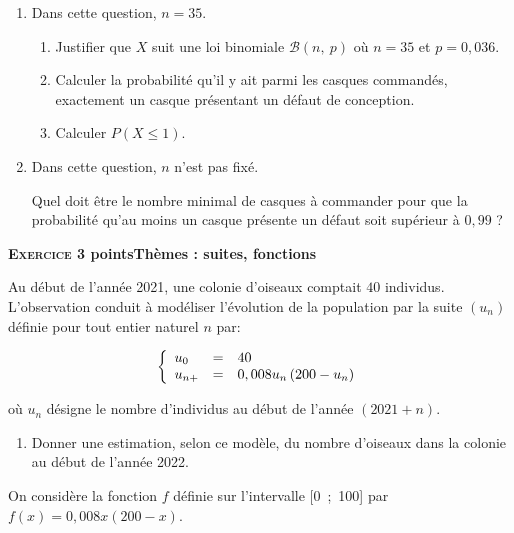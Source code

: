 \medskip

\begin{enumerate}
	\item Dans cette question, $n = 35$.
	      \begin{enumerate}
		      \item Justifier que $X$ suit une loi binomiale $\mathcal{B}(n,~p)$ où $n = 35$ et $p = 0,036$.
		      \item Calculer la probabilité qu'il y ait parmi les casques commandés, exactement un casque présentant un défaut de conception.
		      \item Calculer $P(X \leqslant 1)$.
	      \end{enumerate}
	\item Dans cette question, $n$ n'est pas fixé.

	      Quel doit être le nombre minimal de casques à commander pour que la probabilité
	      qu'au moins un casque présente un défaut soit supérieur à $0,99$ ?
\end{enumerate}

\lipsum
\newpage

\textbf{\textsc{Exercice 3}  points\hfill Thèmes : suites, fonctions}

\medskip

Au début de l'année 2021, une colonie d'oiseaux comptait $40$ individus. L'observation conduit à modéliser l'évolution de la population par la suite $\left(u_n\right)$ définie pour tout entier naturel $n$ par:

\[\left\{\begin{array}{l c l}
		u_0 & = & 40 \\u_{n+}&=&0,008u_n\left(200 - u_n\right)
	\end{array}\right.\]

où $u_n$ désigne le nombre d'individus au début de l'année $(2021+n)$.

\medskip


\begin{enumerate}
	\item Donner une estimation, selon ce modèle, du nombre d'oiseaux dans la colonie au
	      début de l'année 2022.
\end{enumerate}

On considère la fonction $f$ définie sur l'intervalle [0~;~100] par $f(x) = 0,008x(200 - x)$.

